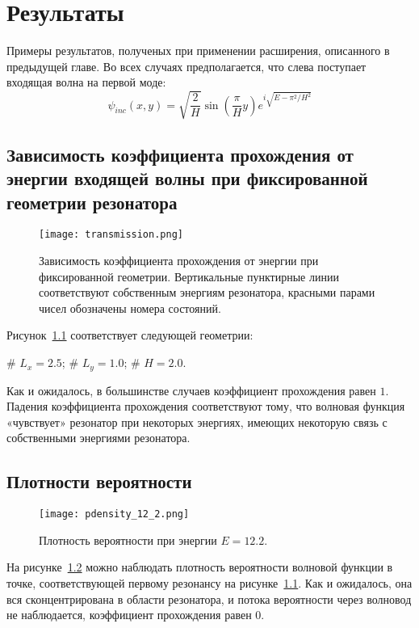 \chapter{Результаты} 
\label{chapter3}

Примеры результатов, полученых при применении расширения, описанного в предыдущей главе. Во всех случаях предполагается, что слева поступает входящая волна на первой моде:
\[
\psi_{inc}(x, y) = \sqrt{\frac{2}{H}} \sin(\frac{\pi}{H} y) e^{i \sqrt{E - \pi^2 / H^2}}
\]

\section{Зависимость коэффициента прохождения от энергии входящей волны при фиксированной геометрии резонатора}
\begin{figure}[H]
\texttt{[image: transmission.png]}
\caption{Зависимость коэффициента прохождения от энергии при фиксированной геометрии. Вертикальные пунктирные линии соответствуют собственным энергиям резонатора, красными парами чисел обозначены номера состояний.}
\label{fig:trans_over_energy}
\end{figure}
Рисунок~\ref{fig:trans_over_energy} соответствует следующей геометрии:
\begin{ilist}
# $L_x = 2.5$;
# $L_y = 1.0$;
# $H = 2.0$.
\end{ilist}
Как и ожидалось, в большинстве случаев коэффициент прохождения равен $1$. Падения коэффициента прохождения соответствуют тому, что волновая функция «чувствует» резонатор при некоторых энергиях, имеющих некоторую связь с собственными энергиями резонатора.

\section{Плотности вероятности}
\begin{figure}[H]
\texttt{[image: pdensity\_12\_2.png]}
\caption{Плотность вероятности при энергии $E = 12.2$.}
\label{fig:pdensity_12_2}
\end{figure}
На рисунке~\ref{fig:pdensity_12_2} можно наблюдать плотность вероятности волновой функции в точке, соответствующей первому резонансу на рисунке~\ref{fig:trans_over_energy}. Как и ожидалось, она вся сконцентрирована в области резонатора, и потока вероятности через волновод не наблюдается, коэффициент прохождения равен $0$.

